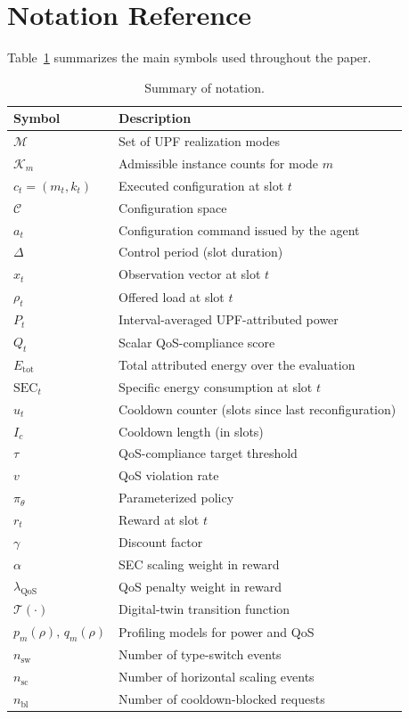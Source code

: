\documentclass[a4paper,fleqn]{cas-sc}
\begin{document}

\appendix
\section{Notation Reference}
\label{app:notation}

Table~\ref{tab:notation} summarizes the main symbols used throughout the paper.

\begin{table}[width=.9\linewidth,cols=2,pos=h]
\centering
\caption{Summary of notation.}
\label{tab:notation}
\small
\begin{tabular}{l l}
\hline
Symbol & Description \\
\hline
$\mathcal{M}$ & Set of UPF realization modes \\
$\mathcal{K}_m$ & Admissible instance counts for mode $m$ \\
$c_t=(m_t,k_t)$ & Executed configuration at slot $t$ \\
$\mathcal{C}$ & Configuration space \\
$a_t$ & Configuration command issued by the agent \\
$\Delta$ & Control period (slot duration) \\
$x_t$ & Observation vector at slot $t$ \\
$\rho_t$ & Offered load at slot $t$ \\
$P_t$ & Interval-averaged UPF-attributed power \\
$Q_t$ & Scalar QoS-compliance score \\
$E_{\mathrm{tot}}$ & Total attributed energy over the evaluation \\
$\mathrm{SEC}_t$ & Specific energy consumption at slot $t$ \\
$u_t$ & Cooldown counter (slots since last reconfiguration) \\
$I_c$ & Cooldown length (in slots) \\
$\tau$ & QoS-compliance target threshold \\
$v$ & QoS violation rate \\
$\pi_\theta$ & Parameterized policy \\
$r_t$ & Reward at slot $t$ \\
$\gamma$ & Discount factor \\
$\alpha$ & SEC scaling weight in reward \\
$\lambda_{\mathrm{QoS}}$ & QoS penalty weight in reward \\
$\mathcal{T}(\cdot)$ & Digital-twin transition function \\
$p_m(\rho),\,q_m(\rho)$ & Profiling models for power and QoS \\
$n_{\mathrm{sw}}$ & Number of type-switch events \\
$n_{\mathrm{sc}}$ & Number of horizontal scaling events \\
$n_{\mathrm{bl}}$ & Number of cooldown-blocked requests \\
\hline
\end{tabular}
\end{table}
\end{document}
